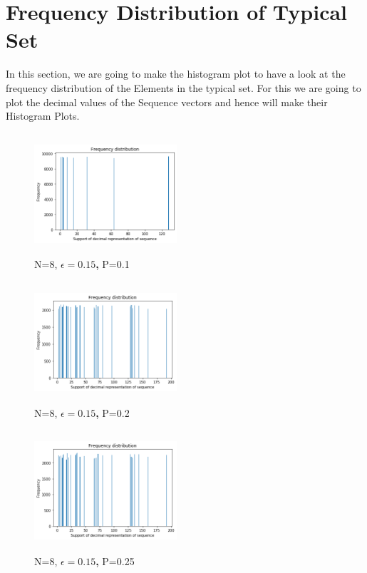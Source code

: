 \documentclass[11pt]{article}
\begin{document}
\section{Frequency Distribution of Typical Set}

In this section, we are going to make the histogram plot to have a look at the frequency distribution of the Elements in the typical set. For this we are going to plot the decimal values of the Sequence vectors and hence will make their Histogram Plots. 


\begin{center}
        \begin{figure}[!h]
        \centering
          \includegraphics[width=200, height=45mm]{1.png}
          \caption{N=8, \textbf{\(\epsilon=0.15\),} P=0.1}
          \label{fig:Piston}
        \end{figure}
\end{center}

\begin{center}
        \begin{figure}[!h]
        \centering
          \includegraphics[width=200, height=45mm]{2.png}
          \caption{N=8, \textbf{\(\epsilon=0.15\),} P=0.2}
          \label{fig:Piston}
        \end{figure}
\end{center}

\begin{center}
        \begin{figure}[!h]
        \centering
          \includegraphics[width=200, height=45mm]{4.png}
          \caption{N=8, \textbf{\(\epsilon=0.15\),} P=0.25}
          \label{fig:Piston}
        \end{figure}
\end{center}
\end{document}

